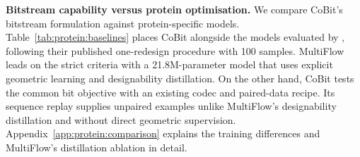 

\textbf{Bitstream capability versus protein optimisation.} We compare CoBit's bitstream formulation against protein-specific models. Table~\ref{tab:protein:baselines} places CoBit alongside the models evaluated by \citet{protein:simpledesign}, following their published one-redesign procedure with 100 samples. MultiFlow \citep{campbell2024multiflow} leads on the strict criteria with a 21.8M-parameter model that uses explicit geometric learning and designability distillation. On the other hand, CoBit tests the common bit objective with an existing codec and paired-data recipe. Its sequence replay supplies unpaired examples unlike MultiFlow's designability distillation and without direct geometric supervision. Appendix~\ref{app:protein:comparison} explains the training differences and MultiFlow's distillation ablation in detail.


